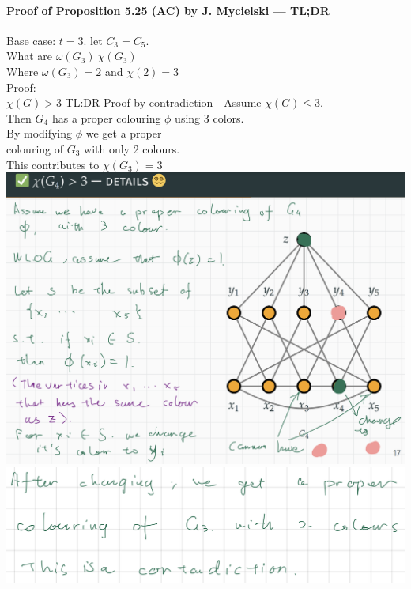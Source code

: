 \documentclass{article}
\begin{document}
\paragraph{Proof of Proposition 5.25 (AC) by J. Mycielski — TL;DR}
Base case: $t=3$. let $C_3=C_5$.\\
What are $\omega(G_3) \ \chi(G_3)$\\
Where $\omega (G_3)=2$ and $\chi (2)=3$\\
Proof:\\
$\chi (G)>3$ TL:DR
Proof by contradiction -
    Assume  $\chi (G)\leq 3$.\\
    Then $G_4$ has a proper colouring $\phi$ using 3 colors.\\
    By modifying $\phi$  we get a proper \\colouring of $G_3$ with only 2 colours.\\
    This contributes to $\chi (G_3)=3$\\
\includegraphics{0094}\\
\includegraphics{0095}\\
\end{document}
